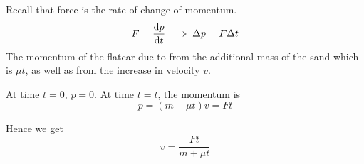 \begin{solution}
Recall that force is the rate of change of momentum. 
\[ F=\dv{p}{t} \implies \Delta p=F\Delta t \]
The momentum of the flatcar due to from the additional mass of the sand which is $\mu t$, as well as from the increase in velocity $v$. 

At time $t = 0$, $p = 0$. At time $t = t$, the momentum is 
\[ p=(m+\mu t)v=Ft \]

Hence we get \[ \boxed{v=\frac{Ft}{m+\mu t}} \]
\end{solution}
\pagebreak